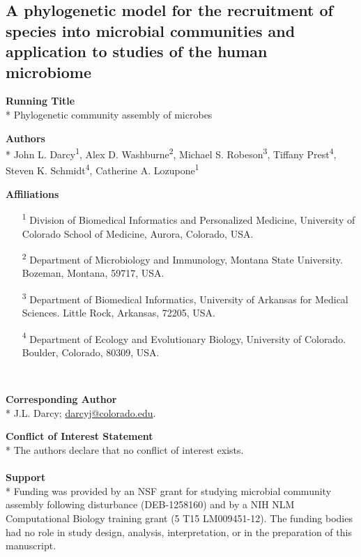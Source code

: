 \documentclass{article}
\begin{document}
{\parindent0pt %
\begin{adjustwidth}{1cm}{1cm} \begin{center}
\section{A phylogenetic model for the recruitment of species into microbial communities and application to studies of the human microbiome}
\end{center}  \end{adjustwidth}

\par
\textbf{Running Title}\\*
Phylogenetic community assembly of microbes
\\\par
\textbf{Authors}\\*
John L. Darcy\textsuperscript{1},
Alex D. Washburne\textsuperscript{2},
Michael S. Robeson\textsuperscript{3},
Tiffany Prest\textsuperscript{4},
Steven K. Schmidt\textsuperscript{4},
Catherine A. Lozupone\textsuperscript{1}
\\\par
\textbf{Affiliations}
\begin{enumerate}[topsep=0pt,itemsep=-1ex,partopsep=1ex,parsep=1ex, leftmargin=*,align=left]
	\item[\textsuperscript{1}] Division of Biomedical Informatics and Personalized Medicine, University of Colorado School of Medicine, Aurora, Colorado, USA.
	\item[\textsuperscript{2}] Department of Microbiology and Immunology, Montana State University. Bozeman, Montana, 59717, USA.
	\item[\textsuperscript{3}] Department of Biomedical Informatics, University of Arkansas for Medical Sciences. Little Rock, Arkansas, 72205, USA.
	\item[\textsuperscript{4}] Department of Ecology and Evolutionary Biology, University of Colorado. Boulder, Colorado, 80309, USA.
\end{enumerate}
\ \par
\textbf{Corresponding Author}\\*
J.L. Darcy; \href{mailto:darcyj@colorado.edu}{darcyj@colorado.edu}.
\\\par
\textbf{Conflict of Interest Statement}\\*
The authors declare that no conflict of interest exists.\\
\\
\textbf{Support}\\*
Funding was provided by an NSF grant for studying microbial community assembly following disturbance (DEB-1258160) and by a NIH NLM Computational Biology training grant (5 T15 LM009451-12). The funding bodies had no role in study design, analysis, interpretation, or in the preparation of this manuscript.\\

} %
\end{document}
